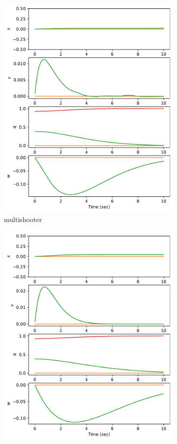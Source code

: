 \documentclass[]{article}
\begin{document}
\begin{figure}[H]
\begin{subfigure}[b]{0.3\textwidth}
		\includegraphics[width=\textwidth]{state45dz2.pdf}
		\caption{multishooter}
	\end{subfigure}
	\begin{subfigure}[b]{0.3\textwidth}
		\centering
		\includegraphics[width=\textwidth]{state45dz3.pdf}

\end{subfigure}
\end{figure}
\end{document}
